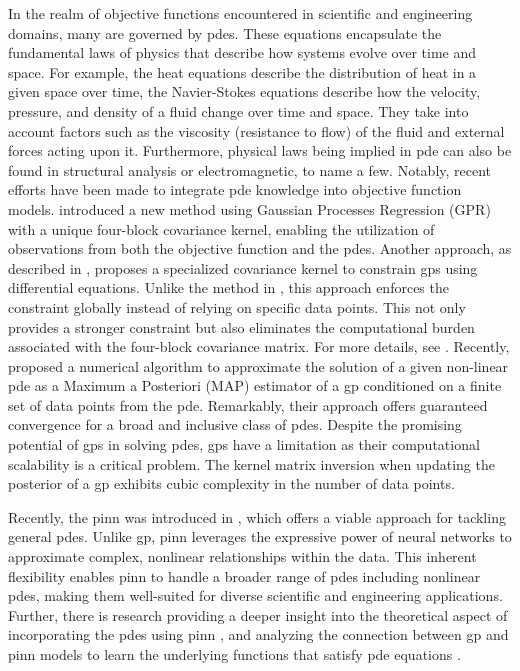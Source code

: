 In the realm of objective functions encountered in scientific and engineering domains, many are governed by \acfp{pde}. These equations encapsulate the fundamental laws of physics that describe how systems evolve over time and space. For example, the heat equations describe the distribution of heat in a given space over time, the Navier-Stokes equations describe how the velocity, pressure, and density of a fluid change over time and space. They take into account factors such as the viscosity (resistance to flow) of the fluid and external forces acting upon it. Furthermore, physical laws being implied in \ac{pde} can also be found in structural analysis or electromagnetic, to name a few. Notably, recent efforts have been made to integrate \ac{pde} knowledge into objective function models. \citet{raissi2017machine} introduced a new method using Gaussian Processes Regression (GPR) with a unique four-block covariance kernel, enabling the utilization of observations from both the objective function and the \acp{pde}. Another approach, as described in \citet{jidling2017linearly}, proposes a specialized covariance kernel to constrain \acfp{gp} using differential equations. Unlike the method in \citet{raissi2017machine}, this approach enforces the constraint globally instead of relying on specific data points. This not only provides a stronger constraint but also eliminates the computational burden associated with the four-block covariance matrix. For more details, see \cite{swiler2020survey}. Recently, \citep{chen2021solving} proposed a numerical algorithm to approximate the solution of a given non-linear \ac{pde} as a Maximum a Posteriori (MAP) estimator of a \ac{gp} conditioned on a finite set of data points from the \ac{pde}. Remarkably, their approach offers guaranteed convergence for a broad and inclusive class of \acp{pde}. Despite the promising potential of \acp{gp} in solving \acp{pde}, \acp{gp} have a limitation as their computational scalability is a critical problem. The kernel matrix inversion when updating the posterior of a \ac{gp} exhibits cubic complexity in the number of data points.      


Recently, the \acf{pinn} was introduced in \citet{raissi2019physics,yang2021b}, which offers a viable approach for tackling general \acp{pde}. Unlike \ac{gp}, \ac{pinn} leverages the expressive power of neural networks to approximate complex, nonlinear relationships within the data. This inherent flexibility enables \ac{pinn} to handle a broader range of \acp{pde} including nonlinear \acp{pde}, making them well-suited for diverse scientific and engineering applications. Further, there is research providing a deeper insight into the theoretical aspect of incorporating the \acp{pde} using \ac{pinn} \citep{schiassi2021extreme,wangL2}, and analyzing the connection between \ac{gp} and \ac{pinn} models to learn the underlying functions that satisfy \ac{pde} equations \citep{wang2022and}. 

